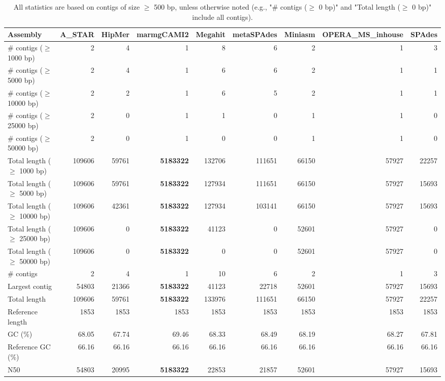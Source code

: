 \documentclass[12pt,a4paper]{article}
\begin{document}
\begin{table}[ht]
\begin{center}
\caption{All statistics are based on contigs of size $\geq$ 500 bp, unless otherwise noted (e.g., "\# contigs ($\geq$ 0 bp)" and "Total length ($\geq$ 0 bp)" include all contigs).}
\begin{tabular}{|l*{8}{|r}|}
\hline
Assembly & A\_STAR & HipMer & marmgCAMI2 & Megahit & metaSPAdes & Miniasm & OPERA\_MS\_inhouse & SPAdes \\ \hline
\# contigs ($\geq$ 1000 bp) & 2 & 4 & 1 & 8 & 6 & 2 & 1 & 3 \\ \hline
\# contigs ($\geq$ 5000 bp) & 2 & 4 & 1 & 6 & 6 & 2 & 1 & 1 \\ \hline
\# contigs ($\geq$ 10000 bp) & 2 & 2 & 1 & 6 & 5 & 2 & 1 & 1 \\ \hline
\# contigs ($\geq$ 25000 bp) & 2 & 0 & 1 & 1 & 0 & 1 & 1 & 0 \\ \hline
\# contigs ($\geq$ 50000 bp) & 2 & 0 & 1 & 0 & 0 & 1 & 1 & 0 \\ \hline
Total length ($\geq$ 1000 bp) & 109606 & 59761 & {\bf 5183322} & 132706 & 111651 & 66150 & 57927 & 22257 \\ \hline
Total length ($\geq$ 5000 bp) & 109606 & 59761 & {\bf 5183322} & 127934 & 111651 & 66150 & 57927 & 15693 \\ \hline
Total length ($\geq$ 10000 bp) & 109606 & 42361 & {\bf 5183322} & 127934 & 103141 & 66150 & 57927 & 15693 \\ \hline
Total length ($\geq$ 25000 bp) & 109606 & 0 & {\bf 5183322} & 41123 & 0 & 52601 & 57927 & 0 \\ \hline
Total length ($\geq$ 50000 bp) & 109606 & 0 & {\bf 5183322} & 0 & 0 & 52601 & 57927 & 0 \\ \hline
\# contigs & 2 & 4 & 1 & 10 & 6 & 2 & 1 & 3 \\ \hline
Largest contig & 54803 & 21366 & {\bf 5183322} & 41123 & 22718 & 52601 & 57927 & 15693 \\ \hline
Total length & 109606 & 59761 & {\bf 5183322} & 133976 & 111651 & 66150 & 57927 & 22257 \\ \hline
Reference length & 1853 & 1853 & 1853 & 1853 & 1853 & 1853 & 1853 & 1853 \\ \hline
GC (\%) & 68.05 & 67.74 & 69.46 & 68.33 & 68.49 & 68.19 & 68.27 & 67.81 \\ \hline
Reference GC (\%) & 66.16 & 66.16 & 66.16 & 66.16 & 66.16 & 66.16 & 66.16 & 66.16 \\ \hline
N50 & 54803 & 20995 & {\bf 5183322} & 22853 & 21857 & 52601 & 57927 & 15693 \\ \hline

\end{tabular}
\end{center}
\end{table}
\end{document}
